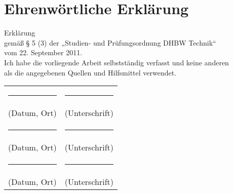 \section*{Ehrenwörtliche Erklärung}

Erklärung\\
\newline
gemäß § 5 (3) der „Studien- und Prüfungsordnung DHBW Technik“\\
vom 22. September 2011.\\
\newline
Ich habe die vorliegende Arbeit selbstständig verfasst und keine anderen\\
als die angegebenen Quellen und Hilfsmittel verwendet.\\

\begin{flushleft}
\begin{tabularx}{\textwidth}{XX}
\noindent\rule{6cm}{0.4pt} & \noindent\rule{6cm}{0.4pt} \\
(Datum, Ort) & (Unterschrift) \\
\noindent\rule{6cm}{0.4pt} & \noindent\rule{6cm}{0.4pt} \\
(Datum, Ort) & (Unterschrift) \\
\noindent\rule{6cm}{0.4pt} & \noindent\rule{6cm}{0.4pt} \\
(Datum, Ort) & (Unterschrift) \\
\end{tabularx}
\end{flushleft}